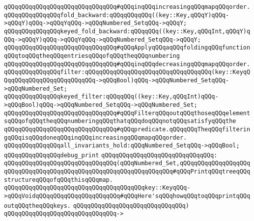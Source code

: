 \verb|qQQqqQQqqQQqqQQqqQQqqQQqqQQqqQQq#qQQqinqQQqincreasingqQQqmapqQQqorder.|\newline
\newline
\verb|qQQqqQQqqQQqqQQqfold_backward:qQQqqQQqqQQq((key::Key,qQQqY)qQQq->qQQqY)qQQq->qQQqYqQQq->qQQqNumbered_SetqQQq->qQQqY;|\newline
\verb|qQQqqQQqqQQqqQQqkeyed_fold_backward:qQQqqQQq((key::Key,qQQqInt,qQQqY)qQQq->qQQqY)qQQq->qQQqYqQQq->qQQqNumbered_SetqQQq->qQQqY;|\newline
\verb|qQQqqQQqqQQqqQQqqQQqqQQqqQQqqQQq#qQQqApplyqQQqaqQQqfoldingqQQqfunctionqQQqtoqQQqtheqQQqentriesqQQqofqQQqtheqQQqnumbering|\newline
\verb|qQQqqQQqqQQqqQQqqQQqqQQqqQQqqQQq#qQQqinqQQqdecreasingqQQqmapqQQqorder.|\newline
\newline
\verb|qQQqqQQqqQQqqQQqfilter:qQQqqQQqqQQqqQQqqQQqqQQqqQQqqQQqqQQq(key::KeyqQQqqQQqqQQqqQQqqQQqqQQqqQQq->qQQqBool)qQQq->qQQqNumbered_SetqQQq->qQQqNumbered_Set;|\newline
\verb|qQQqqQQqqQQqqQQqkeyed_filter:qQQqqQQq((key::Key,qQQqInt)qQQq->qQQqBool)qQQq->qQQqNumbered_SetqQQq->qQQqNumbered_Set;|\newline
\verb|qQQqqQQqqQQqqQQqqQQqqQQqqQQqqQQq#qQQqFilterqQQqoutqQQqthoseqQQqelementsqQQqofqQQqtheqQQqnumberingqQQqthatqQQqdoqQQqnotqQQqsatisfyqQQqthe|\newline
\verb|qQQqqQQqqQQqqQQqqQQqqQQqqQQqqQQq#qQQqpredicate.qQQqqQQqTheqQQqfilteringqQQqisqQQqdoneqQQqinqQQqincreasingqQQqmapqQQqorder.|\newline
\newline
\verb|qQQqqQQqqQQqqQQqall_invariants_hold:qQQqNumbered_SetqQQq->qQQqBool;|\newline
\newline
\verb|qQQqqQQqqQQqqQQqdebug_print|\newline
\verb|qQQqqQQqqQQqqQQqqQQqqQQqqQQqqQQq:|\newline
\verb|qQQqqQQqqQQqqQQqqQQqqQQqqQQqqQQq(qQQqNumbered_Set,qQQqqQQqqQQqqQQqqQQqqQQqqQQqqQQqqQQqqQQqqQQqqQQqqQQqqQQqqQQqqQQqqQQq#qQQqPrintqQQqtreeqQQqstructureqQQqofqQQqthisqQQqmap.|\newline
\verb|qQQqqQQqqQQqqQQqqQQqqQQqqQQqqQQqqQQqqQQqkey::KeyqQQq->qQQqVoidqQQqqQQqqQQqqQQqqQQqqQQq#qQQqHere'sqQQqhowqQQqtoqQQqprintqQQqoutqQQqtheqQQqkeys.|\newline
\verb|qQQqqQQqqQQqqQQqqQQqqQQqqQQqqQQq)|\newline
\verb|qQQqqQQqqQQqqQQqqQQqqQQqqQQqqQQq->|\newline
